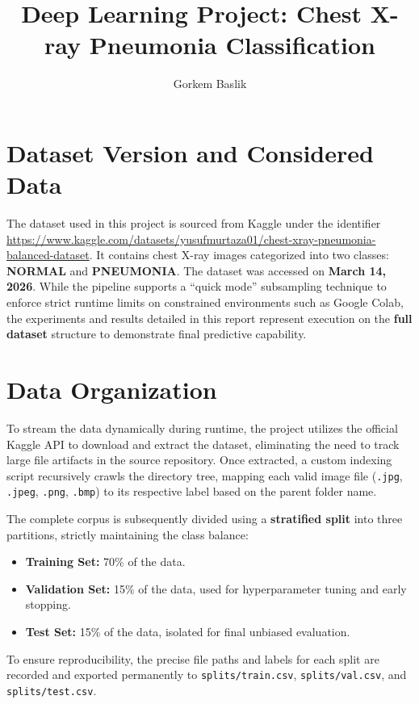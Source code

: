 \documentclass[orivec]{llncs}
\title{Deep Learning Project: Chest X-ray Pneumonia Classification}
\author{Gorkem Baslik}
\institute{Università degli Studi di Milano Statale\\
\email{gorkem.baslik@studenti.unimi.it} \\ \vspace{0.2cm} March 19, 2026}
\begin{document}
\maketitle

\section{Dataset Version and Considered Data}
The dataset used in this project is sourced from Kaggle under the identifier \url{https://www.kaggle.com/datasets/yusufmurtaza01/chest-xray-pneumonia-balanced-dataset}. It contains chest X-ray images categorized into two classes: \textbf{NORMAL} and \textbf{PNEUMONIA}. The dataset was accessed on \textbf{March 14, 2026}. While the pipeline supports a ``quick mode'' subsampling technique to enforce strict runtime limits on constrained environments such as Google Colab, the experiments and results detailed in this report represent execution on the \textbf{full dataset} structure to demonstrate final predictive capability.

\section{Data Organization}
To stream the data dynamically during runtime, the project utilizes the official Kaggle API to download and extract the dataset, eliminating the need to track large file artifacts in the source repository. Once extracted, a custom indexing script recursively crawls the directory tree, mapping each valid image file (\texttt{.jpg}, \texttt{.jpeg}, \texttt{.png}, \texttt{.bmp}) to its respective label based on the parent folder name.

The complete corpus is subsequently divided using a \textbf{stratified split} into three partitions, strictly maintaining the class balance:
\begin{itemize}
  \item \textbf{Training Set:} 70\% of the data.
  \item \textbf{Validation Set:} 15\% of the data, used for hyperparameter tuning and early stopping.
  \item \textbf{Test Set:} 15\% of the data, isolated for final unbiased evaluation.
\end{itemize}
To ensure reproducibility, the precise file paths and labels for each split are recorded and exported permanently to \texttt{splits/train.csv}, \texttt{splits/val.csv}, and \texttt{splits/test.csv}.
\end{document}
